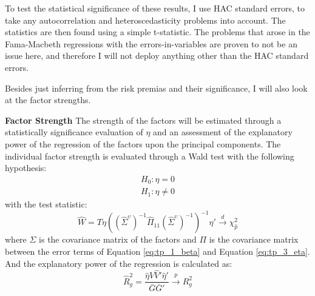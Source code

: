 To test the statistical significance of these results, I use HAC standard errors, to take any autocorrelation and heteroscedasticity problems into account. The statistics are then found using a simple t-statistic. The problems that arose in the Fama-Macbeth regressions with the errors-in-variables are proven to not be an issue here, and therefore I will not deploy anything other than the HAC standard errors. 

Besides just inferring from the risk premias and their significance, I will also look at the factor strengths.

\textbf{Factor Strength} The strength of the factors will be estimated through a statistically significance evaluation of $\eta$ and an assessment of the explanatory power of the regression of the factors upon the principal components. The individual factor strength is evaluated through a Wald test with the following hypothesis:
\begin{equation}
	\begin{array}{c}
		H_{0}:\eta = 0\\
		H_{1}:\eta \neq 0
	\end{array}
\end{equation}
with the test statistic:
\begin{equation}
	\hat{W}=T\eta\left(\left(\hat{\varSigma}^{\upsilon}\right)^{-1}\hat{\varPi}_{11}\left(\hat{\varSigma}^{\upsilon}\right)^{-1}\right)^{-1}\hat{\eta}'\stackrel{d}{\rightarrow}\chi_{\hat{p}}^{2}
\end{equation}
where $\varSigma$ is the covariance matrix of the factors and $\varPi$ is the covariance matrix between the error terms of Equation \ref{eq:tp_1_beta} and Equation \ref{eq:tp_3_eta}. And the explanatory power of the regression is calculated as:
\begin{equation}
	\hat{R}_{g}^{2}=\frac{\hat{\eta}\hat{V}\hat{V}'\hat{\eta}'}{\bar{G}\bar{G}'}\stackrel{p}{\rightarrow}R_{g}^{2}
\end{equation}


